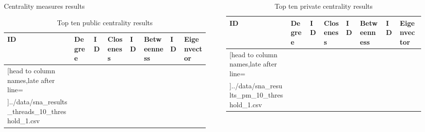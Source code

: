 \documentclass[hyperref={pdfpagelabels=false}]{beamer}
\begin{document}
\begin{frame}[fragile]
\begin{columns}[t]
\begin{column}{.45\textwidth}
\begin{block}{Centrality measures results}
  \begin{table}[!ht]
    \footnotesize
    \caption{Top ten public centrality results}
  	\label{tab:app_undirected_sna_results_top_10_public}
    \begin{tabular}{| l | l || l | l || l | l || l | l |}
  		\hline
  		\textbf{ID} & \textbf{Degree} & \textbf{ID} & \textbf{Closeness} & \textbf{ID} & \textbf{Betweenness} & \textbf{ID} & \textbf{Eigenvector} \\ \hline
  		\csvreader[head to column names,late after line=\\]{../data/sna_results_threads_10_threshold_1.csv}{}
  		{\eidone & \degree & \eidtwo & \closeness & \eidthree & \betweenness & \eidfour & \eigenvector}
  		\hline
  	\end{tabular}
  \end{table}
\end{block}

\end{column}

\begin{column}{.01\textwidth}\end{column} %

\begin{column}{.45\textwidth} %

\begin{exampleblock}{}
  \begin{table}[!ht]
  \footnotesize
  	\caption{Top ten private centrality results}
  	\label{tab:app_undirected_sna_results_top_10_private}
  	\begin{tabular}{| l | l || l | l || l | l || l | l |}
  	  \hline
  	  \textbf{ID} & \textbf{Degree} & \textbf{ID} & \textbf{Closeness} & \textbf{ID} & \textbf{Betweenness} & \textbf{ID} & \textbf{Eigenvector} \\ \hline
  	  \csvreader[head to column names,late after line=\\]{../data/sna_results_pm_10_threshold_1.csv}{}
  	  {\eidone & \degree & \eidtwo & \closeness & \eidthree & \betweenness & \eidfour & \eigenvector}
  	  \hline
  	\end{tabular}
  \end{table}
\end{exampleblock}


\end{column}
\end{columns}
\end{frame}
\end{document}
